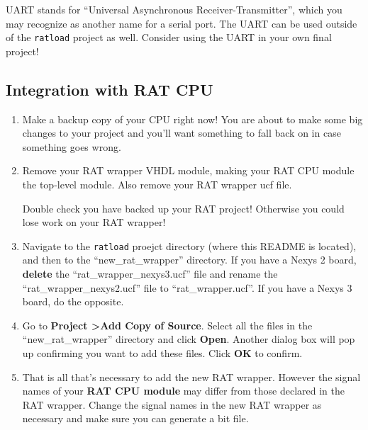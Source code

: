 \documentclass[notitlepage]{article}
\newcommand{\infosign}{\fontencoding{U}\fontfamily{futs}\huge\selectfont\char 116\relax}
\newcommand{\warningsign}{\fontencoding{U}\fontfamily{futs}\Large\selectfont\char 66\relax}
\begin{document}
\begin{infobox}
  {\infosign} UART stands for ``Universal Asynchronous Receiver-Transmitter'', which you may recognize as another name for a serial port. The UART can be used outside of the \texttt{ratload} project as well. Consider using the UART in your own final project!
\end{infobox}

\subsection{Integration with RAT CPU}

\begin {enumerate}

\item Make a backup copy of your CPU right now! You are about to make some big changes to your project and you'll want something to fall back on in case something goes wrong.

\item Remove your RAT wrapper VHDL module, making your RAT CPU module the top-level module. Also remove your RAT wrapper ucf file.

\begin{infobox}
  {\warningsign} Double check you have backed up your RAT project! Otherwise you could lose work on your RAT wrapper!
\end{infobox}

\item Navigate to the \texttt{ratload} proejct directory (where this README is located), and then to the ``new\_rat\_wrapper'' directory. If you have a Nexys 2 board, \textbf{delete} the ``rat\_wrapper\_nexys3.ucf'' file and rename the ``rat\_wrapper\_nexys2.ucf'' file to ``rat\_wrapper.ucf''. If you have a Nexys 3 board, do the opposite.

\item Go to \textbf{Project \textgreater Add Copy of Source}. Select all the files in the ``new\_rat\_wrapper'' directory and click \textbf{Open}. Another dialog box will pop up confirming you want to add these files. Click \textbf{OK} to confirm.

\item That is all that's necessary to add the new RAT wrapper. However the signal names of your \textbf{RAT CPU module} may differ from those declared in the RAT wrapper. Change the signal names in the new RAT wrapper as necessary and make sure you can generate a bit file.
\end{enumerate}
\end{document}
